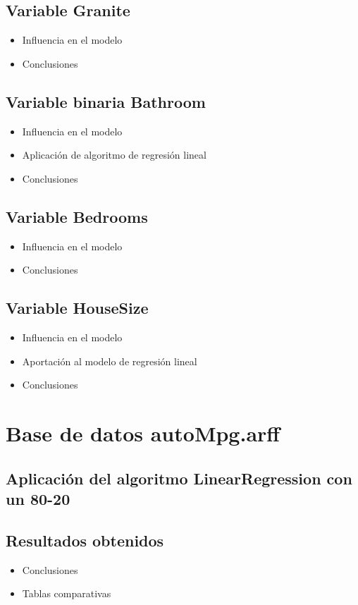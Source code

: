 	\subsection{Variable Granite}
	\begin{itemize}
		\item Influencia en el modelo
		\item Conclusiones
	\end{itemize}
	
	\subsection{Variable binaria Bathroom}
	\begin{itemize}
		\item Influencia en el modelo
		\item Aplicación de algoritmo de regresión lineal
		\item Conclusiones
	\end{itemize}

	\subsection{Variable Bedrooms}
	\begin{itemize}
		\item Influencia en el modelo
		\item Conclusiones
	\end{itemize}

	\subsection{Variable HouseSize}
	\begin{itemize}
		\item Influencia en el modelo
		\item Aportación al modelo de regresión lineal
		\item Conclusiones
	\end{itemize}

\newpage
\section{Base de datos autoMpg.arff}
	
	\subsection{Aplicación del algoritmo LinearRegression con un 80-20}
	\subsection{Resultados obtenidos}
	\begin{itemize}
		\item Conclusiones
		\item Tablas comparativas
	\end{itemize}

